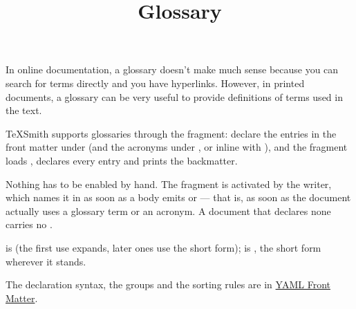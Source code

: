 \documentclass[a4paper,twoside]{article}
\title{Glossary}
\author{}\date{}
\begin{document}
\maketitle
In online documentation, a glossary doesn't make much sense because you can
search for terms directly and you have hyperlinks. However, in printed documents, a
glossary can be very useful to provide definitions of terms used in the text.

TeXSmith supports glossaries through the  fragment: declare the
entries in the front matter under  (and the acronyms
under , or inline with ), and the fragment
loads , declares every entry and prints the backmatter.

Nothing has to be enabled by hand. The fragment is activated by the writer,
which names it in  as soon as a body emits  or
 --- that is, as soon as the document actually uses a glossary term or an
acronym. A document that declares none carries no .

 is  (the first use expands, later ones use the short form);
 is , the short form wherever it stands.

The declaration syntax, the groups and the sorting rules are in
\href{../front-matter.md\#glossary}{YAML Front Matter}.
\end{document}
